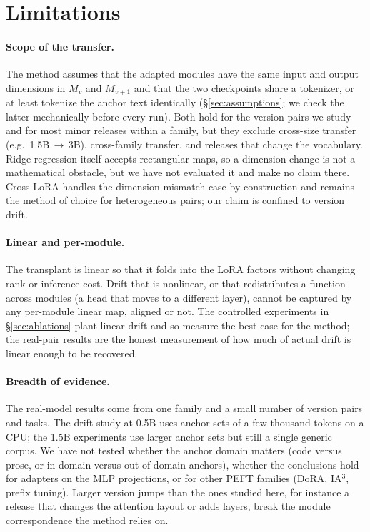 \section{Limitations}
\label{sec:limitations}

\paragraph{Scope of the transfer.}
The method assumes that the adapted modules have the same input and output
dimensions in $M_v$ and $M_{v+1}$ and that the two checkpoints share a
tokenizer, or at least tokenize the anchor text identically
(\S\ref{sec:assumptions}; we check the latter mechanically before every run).
Both hold for the version pairs we study and for most minor releases within a
family, but they exclude cross-size transfer (e.g.\ 1.5B\,$\to$\,3B), cross-family
transfer, and releases that change the vocabulary. Ridge regression itself
accepts rectangular maps, so a dimension change is not a mathematical obstacle,
but we have not evaluated it and make no claim there. Cross-LoRA handles the
dimension-mismatch case by construction and remains the method of choice for
heterogeneous pairs; our claim is confined to version drift.

\paragraph{Linear and per-module.}
The transplant is linear so that it folds into the LoRA factors without
changing rank or inference cost. Drift that is nonlinear, or that redistributes
a function across modules (a head that moves to a different layer), cannot be
captured by any per-module linear map, aligned or not. The controlled
experiments in \S\ref{sec:ablations} plant linear drift and so measure the
best case for the method; the real-pair results are the honest measurement of
how much of actual drift is linear enough to be recovered.

\paragraph{Breadth of evidence.}
The real-model results come from one family and a small number of version
pairs and tasks. The drift study at 0.5B uses anchor sets of a few thousand
tokens on a CPU; the 1.5B experiments use larger anchor sets but still a
single generic corpus. We have not tested whether the anchor domain matters
(code versus prose, or in-domain versus out-of-domain anchors), whether the
conclusions hold for adapters on the MLP projections, or for other PEFT
families (DoRA, IA$^3$, prefix tuning). Larger version jumps than the ones
studied here, for instance a release that changes the attention layout or adds
layers, break the module correspondence the method relies on.

